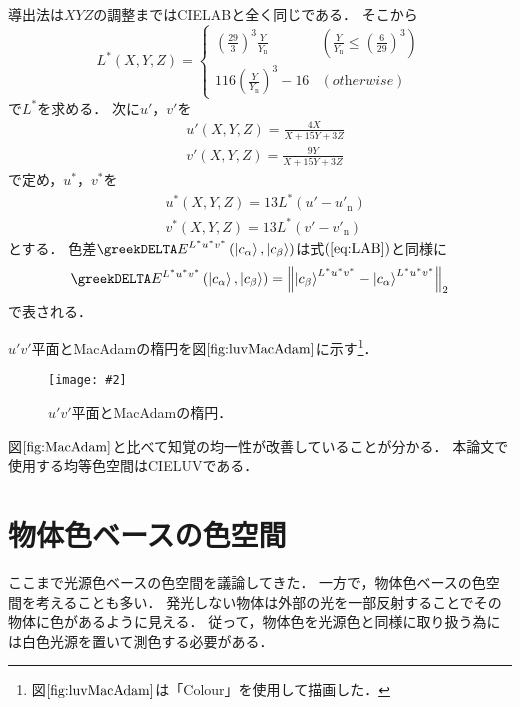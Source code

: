 \documentclass[uplatex,paper=a4,fontsize=4.0truemm,jafontsize=4.0truemm,head_space=30.0truemm,foot_space=30.0truemm,baselineskip=8.0truemm,line_length=40zw,gutter=25.0truemm,oneside,openany,fleqn,hanging_panctuation,open_bracket_pos=nibu_tentsuki,dvipdfmx,jis2004,book,titlepage]{jlreq}
\theoremstyle{mystyle}
\newcommand{\captiondot}[1]{\caption{#1．}}
\newcommand{\figureinput}[4]{\begin{figure}[tbp]\centering\texttt{[image: \#2]}\captiondot{#3}\label{fig:#4}\end{figure}}
\newcommand{\mathdisplaystyle}[1]{\(\displaystyle{#1}\)}
\newcommand{\Reference}[1]{\mathdisplaystyle{\ref{#1}}}
\newcommand{\Equationreference}[1]{\mathdisplaystyle{\parentheses{\ref{#1}}}}
\newcommand{\fraction}[2]{\displaystyle{\frac{\displaystyle{#1}}{\displaystyle{#2}}}}
\newcommand{\parentheses}[1]{\left(#1\right)}
\newcommand{\norm}[2]{{\left\lVert#1\right\rVert}_{#2}}
\newcommand{\Diracket}[1]{\left\lvert#1\right\rangle}
\begin{document}
			導出法は\mathdisplaystyle{XYZ}の調整まではCIELABと全く同じである．
			そこから
			\begin{equation*}
				L^\ast\parentheses{X,Y,Z}=\begin{cases}
					\parentheses{\fraction{29}{3}}^3\fraction{Y}{Y_\textrm{n}} & \parentheses{\fraction{Y}{Y_\textrm{n}}\leq\parentheses{\fraction{6}{29}}^3} \\
					116\parentheses{\fraction{Y}{Y_\textrm{n}}}^3-16 & \parentheses{\textit{otherwise}}
				\end{cases}
			\end{equation*}
			で\mathdisplaystyle{L^\ast}を求める．
			次に\mathdisplaystyle{u'}，\mathdisplaystyle{v'}を
			\begin{align*}
				&u'\parentheses{X,Y,Z}=\fraction{4X}{X+15Y+3Z}\\
				&v'\parentheses{X,Y,Z}=\fraction{9Y}{X+15Y+3Z}
			\end{align*}
			で定め，\mathdisplaystyle{u^\ast}，\mathdisplaystyle{v^\ast}を
			\begin{align*}
				&u^\ast\parentheses{X,Y,Z}=13L^\ast\parentheses{u'-u'_\textrm{n}}\\
				&v^\ast\parentheses{X,Y,Z}=13L^\ast\parentheses{v'-v'_\textrm{n}}
			\end{align*}
			とする．
			色差\mathdisplaystyle{\greekDELTA E^{L^\ast u^\ast v^\ast}\parentheses{\Diracket{c_\alpha},\Diracket{c_\beta}}}は式\Equationreference{eq:LAB}と同様に
			\begin{equation}
				\greekDELTA E^{L^\ast u^\ast v^\ast}\parentheses{\Diracket{c_\alpha},\Diracket{c_\beta}}=\norm{\Diracket{c_\beta}^{L^\ast u^\ast v^\ast}-\Diracket{c_\alpha}^{L^\ast u^\ast v^\ast}}{2}\label{eq:LUV}
			\end{equation}
			で表される．

			\mathdisplaystyle{u'v'}平面とMacAdamの楕円を図\Reference{fig:luvMacAdam}に示す\footnote{図\Reference{fig:luvMacAdam}は「Colour」を使用して描画した．}．
			\figureinput{width=\linewidth}{D:/a/figs/LuvMacAdam.png}{\mathdisplaystyle{u'v'}平面とMacAdamの楕円}{luvMacAdam}
			図\Reference{fig:MacAdam}と比べて知覚の均一性が改善していることが分かる．
			本論文で使用する均等色空間はCIELUVである．
		\section{物体色ベースの色空間}
			ここまで光源色ベースの色空間を議論してきた．
			一方で，物体色ベースの色空間を考えることも多い．
			発光しない物体は外部の光を一部反射することでその物体に色があるように見える．
			従って，物体色を光源色と同様に取り扱う為には白色光源を置いて測色する必要がある．
\end{document}
